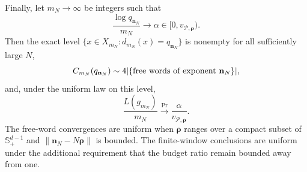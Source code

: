 \begin{theorem}
Finally, let \(m_N\to\infty\) be integers such that
\begin{equation}
 \frac{\log q_{\mathbf n_N}}{m_N}\longrightarrow
 \alpha\in[0,v_{\mathcal P,\boldsymbol\rho}).
 \label{eq:prime-support-inactive-budget}
\end{equation}
Then the exact level
\(\{x\in X_{m_N}:d_{m_N}(x)=q_{\mathbf n_N}\}\) is nonempty for all
sufficiently large \(N\),
\begin{equation}
 C_{m_N}(q_{\mathbf n_N})
 \sim4\lvert \{\text{free words of exponent }\mathbf n_N\} \rvert,
 \label{eq:prime-support-inactive-count}
\end{equation}
and, under the uniform law on this level,
\begin{equation}
 \frac{L(g_{m_N})}{m_N}
 \xrightarrow{\Pr}
 \frac{\alpha}{v_{\mathcal P,\boldsymbol\rho}}.
 \label{eq:prime-support-inactive-window-law}
\end{equation}
The free-word convergences are uniform when \(\boldsymbol\rho\) ranges over a
compact subset of \(\mathbb S_{+}^{d-1}\) and
\(\|\mathbf n_N-N\boldsymbol\rho\|\) is bounded.  The finite-window
conclusions are uniform under the additional requirement that the budget
ratio remain bounded away from one.
\end{theorem}

